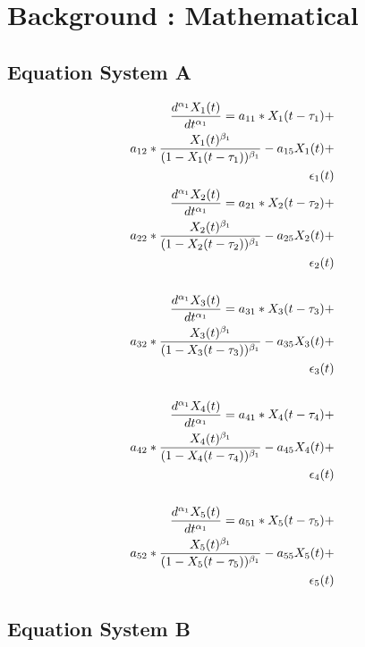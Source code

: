 \section{Background : Mathematical}

\subsection{Equation System A}

\begin{align*} 
\tiny
\frac{d^{\alpha_1}X_1(t)}{dt^{\alpha_1}} = a_{11} *X_1(t - \tau_1) + \\
a_{12} *\frac{X_1(t)^{\beta_1}}{(1-X_1(t - \tau_1))^{\beta_1}} - a_{15}X_1(t) + \\
\epsilon_1(t) \\
\frac{d^{\alpha_1}X_2(t)}{dt^{\alpha_1}} = a_{21} *X_2(t - \tau_2) + \\
a_{22} *\frac{X_2(t)^{\beta_1}}{(1-X_2(t - \tau_2))^{\beta_1}} - a_{25}X_2(t) + \\
\epsilon_2(t) \\ \\
\frac{d^{\alpha_1}X_3(t)}{dt^{\alpha_1}} = a_{31} *X_3(t - \tau_3) + \\
a_{32} *\frac{X_3(t)^{\beta_1}}{(1-X_3(t - \tau_3))^{\beta_1}} - a_{35}X_3(t) + \\
\epsilon_3(t) \\ \\
\frac{d^{\alpha_1}X_4(t)}{dt^{\alpha_1}} = a_{41} *X_4(t - \tau_4) + \\
a_{42} *\frac{X_4(t)^{\beta_1}}{(1-X_4(t - \tau_4))^{\beta_1}} - a_{45}X_4(t) + \\
\epsilon_4(t) \\ \\
\frac{d^{\alpha_1}X_5(t)}{dt^{\alpha_1}} = a_{51} *X_5(t - \tau_5) + \\
a_{52} *\frac{X_5(t)^{\beta_1}}{(1-X_5(t - \tau_5))^{\beta_1}} - a_{55}X_5(t) + \\
\epsilon_5(t) \\
\end{align*}

\subsection{Equation System B}


